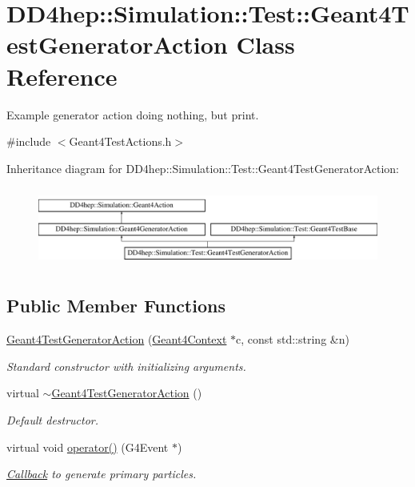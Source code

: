 \hypertarget{class_d_d4hep_1_1_simulation_1_1_test_1_1_geant4_test_generator_action}{}\section{D\+D4hep\+:\+:Simulation\+:\+:Test\+:\+:Geant4\+Test\+Generator\+Action Class Reference}
\label{class_d_d4hep_1_1_simulation_1_1_test_1_1_geant4_test_generator_action}


Example generator action doing nothing, but print.  




{\ttfamily \#include $<$Geant4\+Test\+Actions.\+h$>$}

Inheritance diagram for D\+D4hep\+:\+:Simulation\+:\+:Test\+:\+:Geant4\+Test\+Generator\+Action\+:\begin{figure}[H]
\begin{center}
\leavevmode
\includegraphics[height=2.625000cm]{class_d_d4hep_1_1_simulation_1_1_test_1_1_geant4_test_generator_action}
\end{center}
\end{figure}
\subsection*{Public Member Functions}
\begin{DoxyCompactItemize}
\item 
\hyperlink{class_d_d4hep_1_1_simulation_1_1_test_1_1_geant4_test_generator_action_a7bbaab8b38a9771b99190c270fedb637}{Geant4\+Test\+Generator\+Action} (\hyperlink{class_d_d4hep_1_1_simulation_1_1_geant4_context}{Geant4\+Context} $\ast$c, const std\+::string \&n)
\begin{DoxyCompactList}\small\item\em Standard constructor with initializing arguments. \end{DoxyCompactList}\item 
virtual \hyperlink{class_d_d4hep_1_1_simulation_1_1_test_1_1_geant4_test_generator_action_a41570e16f5e7aa86d68cf44764feb852}{$\sim$\+Geant4\+Test\+Generator\+Action} ()
\begin{DoxyCompactList}\small\item\em Default destructor. \end{DoxyCompactList}\item 
virtual void \hyperlink{class_d_d4hep_1_1_simulation_1_1_test_1_1_geant4_test_generator_action_af50b716c4764ffa0bf42c4b01ee3d394}{operator()} (G4\+Event $\ast$)
\begin{DoxyCompactList}\small\item\em \hyperlink{class_d_d4hep_1_1_callback}{Callback} to generate primary particles. \end{DoxyCompactList}\end{DoxyCompactItemize}
